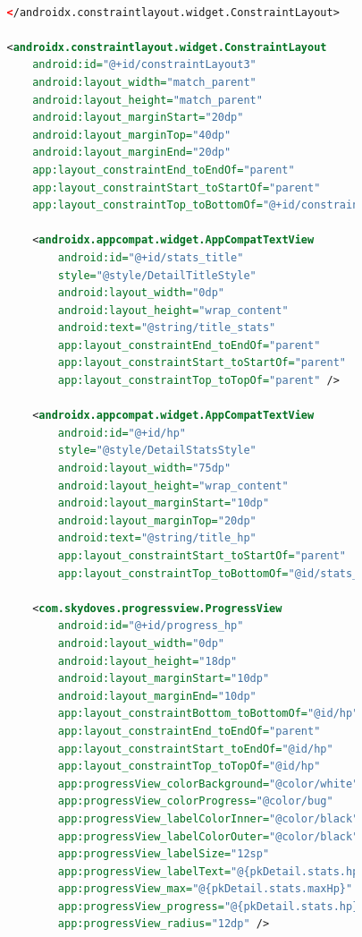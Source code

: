 \documentclass[a4paper, 12pt]{article}
\begin{document}
\begin{lstlisting}[caption={Pokemon Detail Layout.}, label={layout:pk_detail}, language=XML]
    
                </androidx.constraintlayout.widget.ConstraintLayout>
    
                <androidx.constraintlayout.widget.ConstraintLayout
                    android:id="@+id/constraintLayout3"
                    android:layout_width="match_parent"
                    android:layout_height="match_parent"
                    android:layout_marginStart="20dp"
                    android:layout_marginTop="40dp"
                    android:layout_marginEnd="20dp"
                    app:layout_constraintEnd_toEndOf="parent"
                    app:layout_constraintStart_toStartOf="parent"
                    app:layout_constraintTop_toBottomOf="@+id/constraintLayout2">
    
                    <androidx.appcompat.widget.AppCompatTextView
                        android:id="@+id/stats_title"
                        style="@style/DetailTitleStyle"
                        android:layout_width="0dp"
                        android:layout_height="wrap_content"
                        android:text="@string/title_stats"
                        app:layout_constraintEnd_toEndOf="parent"
                        app:layout_constraintStart_toStartOf="parent"
                        app:layout_constraintTop_toTopOf="parent" />
    
                    <androidx.appcompat.widget.AppCompatTextView
                        android:id="@+id/hp"
                        style="@style/DetailStatsStyle"
                        android:layout_width="75dp"
                        android:layout_height="wrap_content"
                        android:layout_marginStart="10dp"
                        android:layout_marginTop="20dp"
                        android:text="@string/title_hp"
                        app:layout_constraintStart_toStartOf="parent"
                        app:layout_constraintTop_toBottomOf="@id/stats_title" />
    
                    <com.skydoves.progressview.ProgressView
                        android:id="@+id/progress_hp"
                        android:layout_width="0dp"
                        android:layout_height="18dp"
                        android:layout_marginStart="10dp"
                        android:layout_marginEnd="10dp"
                        app:layout_constraintBottom_toBottomOf="@id/hp"
                        app:layout_constraintEnd_toEndOf="parent"
                        app:layout_constraintStart_toEndOf="@id/hp"
                        app:layout_constraintTop_toTopOf="@id/hp"
                        app:progressView_colorBackground="@color/white"
                        app:progressView_colorProgress="@color/bug"
                        app:progressView_labelColorInner="@color/black"
                        app:progressView_labelColorOuter="@color/black"
                        app:progressView_labelSize="12sp"
                        app:progressView_labelText="@{pkDetail.stats.hp}"
                        app:progressView_max="@{pkDetail.stats.maxHp}"
                        app:progressView_progress="@{pkDetail.stats.hp}"
                        app:progressView_radius="12dp" />
    

\end{lstlisting}
\end{document}
